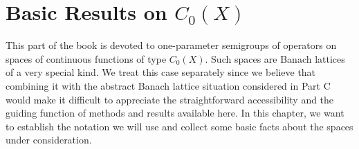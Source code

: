 
%
%
%
%
%
%
%
%
%
%
%
%

\chapter{Basic Results on $C_{0}(X)$}\label{chap:B-I}

This part of the book is devoted to one-parameter semigroups of operators on spaces of continuous functions of type $C_{0}(X)$.
Such spaces are Banach lattices of a very special kind.
We treat this case separately since we believe that combining it with the abstract Banach lattice situation considered in Part C would make it difficult to appreciate the straightforward accessibility and the guiding function of methods and results available here.
In this chapter, we want to establish the notation we will use and collect some basic facts about the spaces under consideration.

